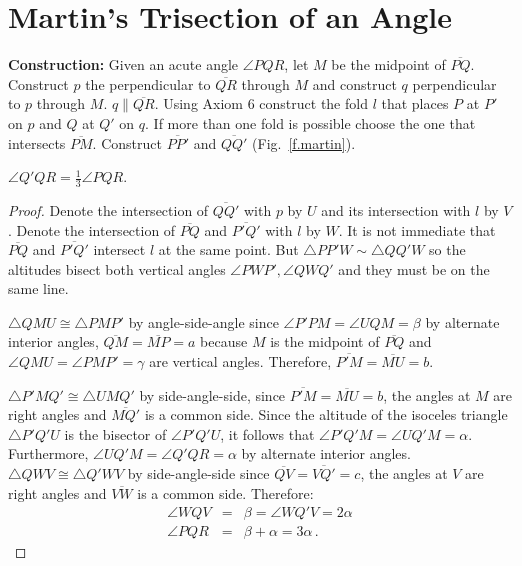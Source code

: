 \newpage

\section{Martin's Trisection of an Angle}\label{s.martin-trisection}

\noindent\textbf{Construction:}
Given an acute angle $\angle PQR$, let $M$ be the midpoint of $\overline{PQ}$. Construct $p$ the perpendicular to $\overline{QR}$ through $M$ and construct $q$ perpendicular to $p$ through $M$. $q\|\overline{QR}$. Using Axiom 6 construct the fold $l$ that places $P$ at $P'$ on $p$ and $Q$ at $Q'$ on $q$. If more than one fold is possible choose the one that intersects $\overline{PM}$. Construct $\overline{PP'}$ and $\overline{QQ'}$  (Fig.~\ref{f.martin}).

\begin{theorem}
$\angle Q'QR=\frac{1}{3}\angle PQR$.
\end{theorem}
\begin{proof}
Denote the intersection of $\overline{QQ'}$ with $p$ by $U$ and its intersection with $l$ by $V$. Denote the intersection of $\overline{PQ}$ and $\overline{P'Q'}$ with $l$ by $W$. It is not immediate that $\overline{PQ}$ and $\overline{P'Q'}$ intersect $l$ at the same point. But $\triangle PP'W \sim \triangle QQ'W$ so the altitudes bisect both vertical angles $\angle PWP', \angle QWQ'$ and they must be on the same line.

$\triangle QMU\cong \triangle PMP'$ by angle-side-angle since  $\angle P'PM=\angle UQM=\beta$ by alternate interior angles, $\overline{QM}=\overline{MP}=a$ because $M$ is the midpoint of $\overline{PQ}$ and $\angle QMU=\angle PMP'=\gamma$ are vertical angles. Therefore, $\overline{P'M}=\overline{MU}=b$.

\newpage

$\triangle P'MQ'\cong \triangle UMQ'$ by side-angle-side, since $\overline{P'M}=\overline{MU}=b$, the angles at $M$ are right angles and $\overline{MQ'}$ is a common side. Since the altitude of the isoceles triangle $\triangle P'Q'U$ is the bisector of $\angle P'Q'U$, it follows that $\angle P'Q'M=\angle UQ'M=\alpha$. Furthermore, $\angle UQ'M=\angle Q'QR=\alpha$ by alternate interior angles. $\triangle QWV\cong\triangle Q'WV$ by side-angle-side since $\overline{QV}=\overline{VQ'}=c$, the angles at $V$ are right angles and $\overline{VW}$ is a common side. Therefore:
\begin{eqnarray*}
\angle WQV&=&\beta=\angle WQ'V=2\alpha\\
\angle PQR &=& \beta + \alpha = 3\alpha\,.
\end{eqnarray*}
\end{proof}

